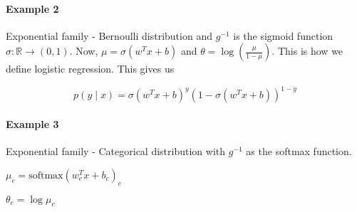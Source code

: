 \documentclass{article}
\begin{document}
\paragraph{Example 2} Exponential family - Bernoulli distribution and $g^{-1}$ is the sigmoid function $\sigma: \mathbb{R} \rightarrow (0, 1)$.
Now, $\mu = \sigma(w^Tx + b)$ and $\theta = \log \left(\frac{\mu }{1 - \mu}\right)$. This is how we define logistic regression. This gives us

$$p(y \mid x) = \sigma(w^Tx + b)^y(1 - \sigma(w^Tx + b))^{1-y}$$

\paragraph{Example 3} Exponential family - Categorical distribution with $g^{-1}$ as the softmax function.

$\mu_c = \text{softmax}(w_c^T x + b_c)_c$

$\theta_c = \log \mu_c$ 
\end{document}
